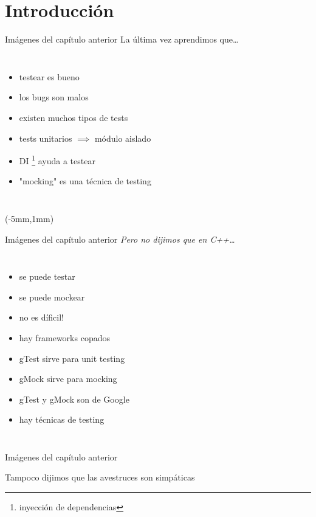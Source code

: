 \section{Introducci\'on}
\begin{frame}[t]{Im\'agenes del cap\'itulo anterior}
La \'ultima vez aprendimos que\ldots
\begin{columns}[onlytextwidth]
	\begin{itemize}
		\item testear es bueno
		\item los bugs son malos
		\item existen muchos tipos de tests
		\item tests unitarios $\implies$ m\'odulo aislado
		\item DI \footnote{inyecci\'on de dependencias} ayuda a testear
		\item "mocking" es una t\'ecnica de testing
	\end{itemize}
\end{columns}
\begin{textblock*}{30mm}(-5mm,1mm)
\end{textblock*}
\end{frame}


\begin{frame}[t]{Im\'agenes del cap\'itulo anterior}
\textit{ Pero no dijimos que en C++\ldots }
\begin{columns}[t,onlytextwidth]
	\begin{itemize}
		\item se puede testar
		\item se puede mockear
		\item no es d\'ificil!
		\item hay frameworks copados
		\item gTest sirve para unit testing
		\item gMock sirve para mocking
		\item gTest y gMock son de Google
		\item hay t\'ecnicas de testing
	\end{itemize}
\end{columns}
\end{frame}

\begin{frame}{Im\'agenes del cap\'itulo anterior}
\begin{center}
Tampoco dijimos que las avestruces son simp\'aticas
\end{center}
\end{frame}



